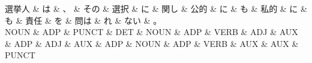 \documentclass[tikz,border=5pt]{standalone}
\begin{document}
\normalsize
\begin{dependency}[edge unit distance=12.0pt]
    \begin{deptext}[column sep=1em]
        選挙人 \& は \& 、 \& その \& 選択 \& に \& 関し \& 公的 \& に \& も \& 私的 \& に \& も \& 責任 \& を \& 問は \& れ \& ない \& 。\\
        NOUN \& ADP \& PUNCT \& DET \& NOUN \& ADP \& VERB \& ADJ \& AUX \& ADP \& ADJ \& AUX \& ADP \& NOUN \& ADP \& VERB \& AUX \& AUX \& PUNCT\\
    \end{deptext}
\end{dependency}
\end{document}
